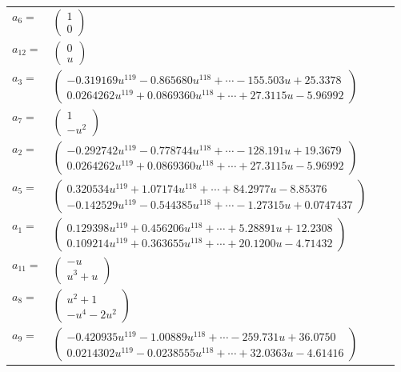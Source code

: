 \documentclass[1p]{elsarticle_modified}
\theoremstyle{definition}
\begin{document}
\begin{tabular}{m{7pt} m{180pt} m{7pt} m{180pt} }
\flushright $a_{6}=$&$\begin{pmatrix}1\\0\end{pmatrix}$ \\
\flushright $a_{12}=$&$\begin{pmatrix}0\\u\end{pmatrix}$ \\
\flushright $a_{3}=$&$\begin{pmatrix}-0.319169 u^{119}-0.865680 u^{118}+\cdots-155.503 u+25.3378\\0.0264262 u^{119}+0.0869360 u^{118}+\cdots+27.3115 u-5.96992\end{pmatrix}$ \\
\flushright $a_{7}=$&$\begin{pmatrix}1\\- u^2\end{pmatrix}$ \\
\flushright $a_{2}=$&$\begin{pmatrix}-0.292742 u^{119}-0.778744 u^{118}+\cdots-128.191 u+19.3679\\0.0264262 u^{119}+0.0869360 u^{118}+\cdots+27.3115 u-5.96992\end{pmatrix}$ \\
\flushright $a_{5}=$&$\begin{pmatrix}0.320534 u^{119}+1.07174 u^{118}+\cdots+84.2977 u-8.85376\\-0.142529 u^{119}-0.544385 u^{118}+\cdots-1.27315 u+0.0747437\end{pmatrix}$ \\
\flushright $a_{1}=$&$\begin{pmatrix}0.129398 u^{119}+0.456206 u^{118}+\cdots+5.28891 u+12.2308\\0.109214 u^{119}+0.363655 u^{118}+\cdots+20.1200 u-4.71432\end{pmatrix}$ \\
\flushright $a_{11}=$&$\begin{pmatrix}- u\\u^3+u\end{pmatrix}$ \\
\flushright $a_{8}=$&$\begin{pmatrix}u^2+1\\- u^4-2 u^2\end{pmatrix}$ \\
\flushright $a_{9}=$&$\begin{pmatrix}-0.420935 u^{119}-1.00889 u^{118}+\cdots-259.731 u+36.0750\\0.0214302 u^{119}-0.0238555 u^{118}+\cdots+32.0363 u-4.61416\end{pmatrix}$ \\

\end{tabular}
\end{document}

